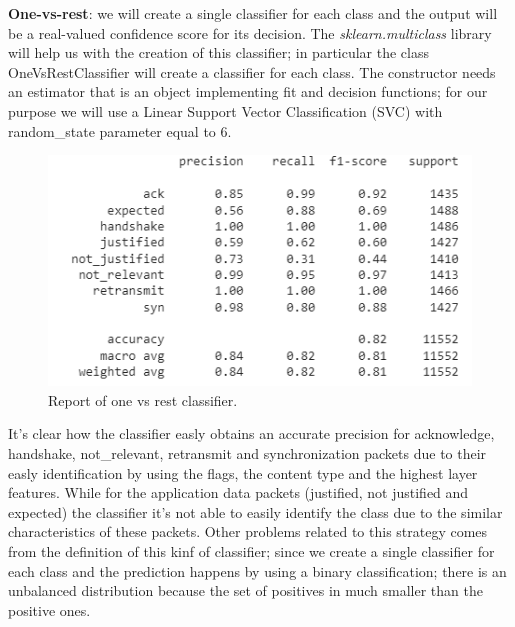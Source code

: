 \documentclass[sigconf]{acmart}
\begin{document}
    \textbf{One-vs-rest}: we will create a single classifier for each class and the output will be a real-valued confidence score for its decision. The \textit{sklearn.multiclass} library will help us with the creation of this classifier; in particular the class OneVsRestClassifier will create a classifier for each class. The constructor needs an estimator that is an object implementing fit and decision functions; for our purpose we will use a Linear Support Vector Classification (SVC) with random\_state parameter equal to 6.
    \begin{figure}[h!]
        \includegraphics[width=\linewidth]{img/one_vs_rest_classifier.png}
        \caption{Report of one vs rest classifier.}
        \label{fig:one_vs_rest_classifier}
    \end{figure}
    It's clear how the classifier easly obtains an accurate precision for acknowledge, handshake, not\_relevant, retransmit and synchronization packets due to their easly identification by using the flags, the content type and the highest layer features. While for the application data packets (justified, not justified and expected) the classifier it's not able to easily identify the class due to the similar characteristics of these packets. Other problems related to this strategy comes from the definition of this kinf of classifier; since we create a single classifier for each class and the prediction happens by using a binary classification; there is an unbalanced distribution because the set of positives in much smaller than the positive ones.
\end{document}
